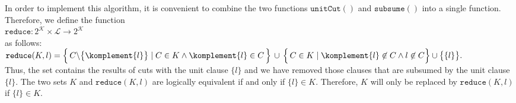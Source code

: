 In order to implement this algorithm, it is convenient to combine the two functions $\texttt{unitCut}()$ and
$\texttt{subsume}()$ into a single function. Therefore, we define the function
\\[0.2cm]
\hspace*{1.3cm}
$\texttt{reduce}: 2^\mathcal{K} \times \mathcal{L} \rightarrow 2^\mathcal{K}$
\\[0.2cm]
as follows: 
\\[0.2cm]
\hspace*{1.3cm}
$\texttt{reduce}(K,l)  = 
 \Bigl\{\, C \backslash \bigl\{\komplement{l}\bigr\} \;|\; C \in K \wedge \komplement{l} \in C \,\Bigr\} 
       \,\cup\, \Bigl\{\, C \in K \mid \komplement{l} \not\in C \wedge l \not\in C \Bigr\} \cup \bigl\{\{l\}\bigr\}.
$
\\[0.2cm]
Thus, the set contains the results of cuts with
the unit clause $\{l\}$ and we have removed those clauses that are subsumed by the unit clause $\{l\}$.
The two sets $K$ and $\texttt{reduce}(K,l)$ are logically equivalent if and only if $\{l\} \in K$.
Therefore, $K$ will only be replaced by $\mathtt{reduce}(K, l)$ if $\{l\} \in K$.

